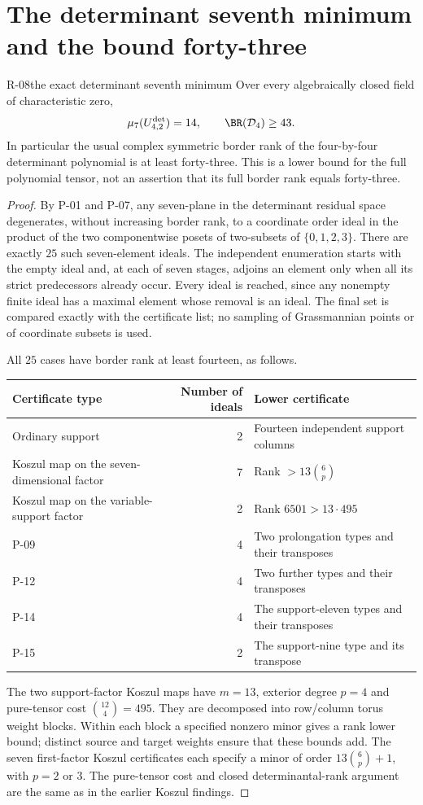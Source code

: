 \section{The determinant seventh minimum and the bound forty-three}

\begin{finding}{R-08}{the exact determinant seventh minimum}
Over every algebraically closed field of characteristic zero,
\[
 \mu_7(U^{\det}_{4,2})=14,\qquad
 \BR(\mathcal D_4)\geq43.
\]
In particular the usual complex symmetric border rank of the
four-by-four determinant polynomial is at least forty-three.
This is a lower bound for the full polynomial tensor, not an
assertion that its full border rank equals forty-three.
\end{finding}
\begin{proof}
By P-01 and P-07, any seven-plane in the determinant residual
space degenerates, without increasing border rank, to a
coordinate order ideal in the product of the two componentwise
posets of two-subsets of $\{0,1,2,3\}$. There are exactly
$25$ such seven-element ideals. The independent enumeration
starts with the empty ideal and, at each of seven stages,
adjoins an element only when all its strict predecessors
already occur. Every ideal is reached, since any nonempty
finite ideal has a maximal element whose removal is an ideal.
The final set is compared exactly with the certificate list;
no sampling of Grassmannian points or of coordinate subsets
is used.

All $25$ cases have border rank at least fourteen, as follows.
\begin{center}
\begin{tabular}{l|r|l}
Certificate type&Number of ideals&Lower certificate\\\hline
Ordinary support&2&Fourteen independent support columns\\
Koszul map on the seven-dimensional factor&7&Rank $>13\binom6p$\\
Koszul map on the variable-support factor&2&Rank $6501>13\cdot495$\\
P-09&4&Two prolongation types and their transposes\\
P-12&4&Two further types and their transposes\\
P-14&4&The support-eleven types and their transposes\\
P-15&2&The support-nine type and its transpose
\end{tabular}
\end{center}
The two support-factor Koszul maps have $m=13$, exterior
degree $p=4$ and pure-tensor cost $\binom{12}4=495$.
They are decomposed into row/column torus weight blocks.
Within each block a specified nonzero minor gives a rank
lower bound; distinct source and target weights ensure
that these bounds add. The seven first-factor Koszul
certificates each specify a minor of order
$13\binom6p+1$, with $p=2$ or $3$.
The pure-tensor cost and closed determinantal-rank argument
are the same as in the earlier Koszul findings.


\end{proof}
